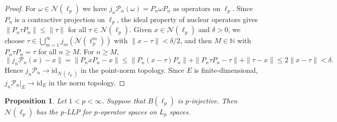 \documentclass[12pt]{article}
\newtheorem{proposition}[theorem]{Proposition}
\begin{document}
\begin{proof}
For $\omega\in \mathcal{N}(\ell_p)$ we have
$j_n\mathcal{P}_n(\omega)=P_n\omega P_n$ as operators on $\ell_p$.
Since $P_n$ is a contractive projection on $\ell_p$, the ideal property of
nuclear operators gives $\|P_n\tau P_n\|\leq\|\tau\|$ for all
$\tau\in \mathcal{N}(\ell_p)$.
Given $x\in \mathcal{N}(\ell_p)$ and $\delta>0$, we choose
$\tau\in \bigcup_{m=1}^\infty j_m(\mathcal{N}(\ell_p^m))$ with $\|x-\tau\|<\delta/2$, and then $M\in\mathbb{N}$ with $P_n\tau P_n=\tau$ for
all $n\geq M$.
For $n\geq M$,
\[
        \|j_n\mathcal{P}_n(x)-x\|
        =\|P_nxP_n-x\|
        \leq\|P_n(x-\tau)P_n\|+\|P_n\tau P_n-\tau\|+\|\tau-x\|
        \leq 2\|x-\tau\|<\delta.
\]
Hence $j_n\mathcal{P}_n\to \mathrm{id}_{\mathcal{N}(\ell_p)}$ in the point-norm topology.
Since $E$ is finite-dimensional, $j_n\mathcal{P}_n|_E\to\mathrm{id}_E$ in the norm topology.
\end{proof}

\begin{proposition}\label{prop:inj-to-llp}
Let $1<p<\infty$.  Suppose that $B(\ell_p)$ is $p$-injective.
Then $\mathcal{N}(\ell_p)$ has the $p$-LLP for $p$-operator spaces on $L_p$ spaces.
\end{proposition}
\end{document}
